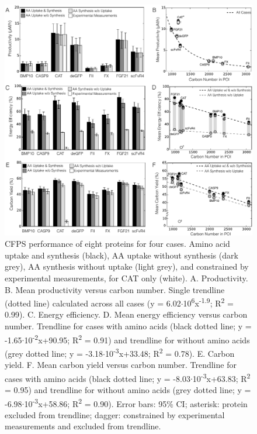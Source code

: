 \documentclass[journal=asbcd6,manuscript=article]{achemso}
\begin{document}
\begin{figure}[t!]
\centering
\includegraphics[width=1.00\textwidth]{./figs/Fig-2-Performance-Analysis.pdf}
\caption{CFPS performance of eight proteins for four cases. Amino acid uptake and synthesis (black), AA uptake without synthesis (dark grey), AA synthesis without uptake (light grey), and constrained by experimental measurements, for CAT only (white). A. Productivity. B. Mean productivity versus carbon number. Single trendline (dotted line) calculated across all cases (y = 6.02$\cdot$10\textsuperscript{6}x\textsuperscript{-1.9}; R\textsuperscript{2} = 0.99).
C. Energy efficiency. D. Mean energy efficiency versus carbon number. Trendline for cases with amino acids (black dotted line; y = -1.65$\cdot$10\textsuperscript{-2}x+90.95; R\textsuperscript{2} = 0.91) and trendline for without amino acids (grey dotted line; y = -3.18$\cdot$10\textsuperscript{-3}x+33.48; R\textsuperscript{2} = 0.78).
E. Carbon yield. F. Mean carbon yield versus carbon number. Trendline for cases with amino acids (black dotted line; y = -8.03$\cdot$10\textsuperscript{-3}x+63.83; R\textsuperscript{2} = 0.95) and trendline for without amino acids (grey dotted line; y = -6.98$\cdot$10\textsuperscript{-3}x+58.86; R\textsuperscript{2} = 0.90).
Error bars: 95\% CI; asterisk: protein excluded from trendline; dagger: constrained by experimental measurements and excluded from trendline.}
\label{fig:Prof}
\end{figure}
\end{document}
